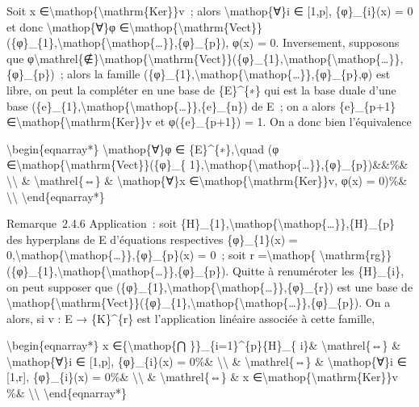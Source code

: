 \documentclass[]{article}
\begin{document}
Soit x ∈\textbackslash{}mathop\{\textbackslash{}mathrm\{Ker\}\}v~; alors
\textbackslash{}mathop\{∀\}i ∈ {[}1,p{]}, \{φ\}\_\{i\}(x) = 0 et donc
\textbackslash{}mathop\{∀\}φ
∈\textbackslash{}mathop\{\textbackslash{}mathrm\{Vect\}\}(\{φ\}\_\{1\},\textbackslash{}mathop\{\textbackslash{}mathop\{\ldots{}\}\},\{φ\}\_\{p\}),
φ(x) = 0. Inversement, supposons que
φ\textbackslash{}mathrel\{∉\}\textbackslash{}mathop\{\textbackslash{}mathrm\{Vect\}\}(\{φ\}\_\{1\},\textbackslash{}mathop\{\textbackslash{}mathop\{\ldots{}\}\},\{φ\}\_\{p\})~;
alors la famille
(\{φ\}\_\{1\},\textbackslash{}mathop\{\textbackslash{}mathop\{\ldots{}\}\},\{φ\}\_\{p\},φ)
est libre, on peut la compléter en une base de \{E\}\^{}\{∗\} qui est la
base duale d'une base
(\{e\}\_\{1\},\textbackslash{}mathop\{\textbackslash{}mathop\{\ldots{}\}\},\{e\}\_\{n\})
de E~; on a alors \{e\}\_\{p+1\}
∈\textbackslash{}mathop\{\textbackslash{}mathrm\{Ker\}\}v et
φ(\{e\}\_\{p+1\}) = 1. On a donc bien l'équivalence

\textbackslash{}begin\{eqnarray*\} \textbackslash{}mathop\{∀\}φ ∈
\{E\}\^{}\{∗\},\textbackslash{}quad (φ
∈\textbackslash{}mathop\{\textbackslash{}mathrm\{Vect\}\}(\{φ\}\_\{
1\},\textbackslash{}mathop\{\textbackslash{}mathop\{\ldots{}\}\},\{φ\}\_\{p\})\&\&\%\&
\textbackslash{}\textbackslash{} \& \textbackslash{}mathrel\{⇔\} \&
\textbackslash{}mathop\{∀\}x
∈\textbackslash{}mathop\{\textbackslash{}mathrm\{Ker\}\}v, φ(x) = 0)\%\&
\textbackslash{}\textbackslash{} \textbackslash{}end\{eqnarray*\}

Remarque~2.4.6 Application~: soit
\{H\}\_\{1\},\textbackslash{}mathop\{\textbackslash{}mathop\{\ldots{}\}\},\{H\}\_\{p\}
des hyperplans de E d'équations respectives \{φ\}\_\{1\}(x) =
0,\textbackslash{}mathop\{\textbackslash{}mathop\{\ldots{}\}\},\{φ\}\_\{p\}(x)
= 0~; soit r =\textbackslash{}mathop\{
\textbackslash{}mathrm\{rg\}\}(\{φ\}\_\{1\},\textbackslash{}mathop\{\textbackslash{}mathop\{\ldots{}\}\},\{φ\}\_\{p\}).
Quitte à renuméroter les \{H\}\_\{i\}, on peut supposer que
(\{φ\}\_\{1\},\textbackslash{}mathop\{\textbackslash{}mathop\{\ldots{}\}\},\{φ\}\_\{r\})
est une base de
\textbackslash{}mathop\{\textbackslash{}mathrm\{Vect\}\}(\{φ\}\_\{1\},\textbackslash{}mathop\{\textbackslash{}mathop\{\ldots{}\}\},\{φ\}\_\{p\}).
On a alors, si v : E → \{K\}\^{}\{r\} est l'application linéaire
associée à cette famille,

\textbackslash{}begin\{eqnarray*\} x ∈\{\textbackslash{}mathop\{⋂
\}\}\_\{i=1\}\^{}\{p\}\{H\}\_\{ i\}\& \textbackslash{}mathrel\{⇔\} \&
\textbackslash{}mathop\{∀\}i ∈ {[}1,p{]}, \{φ\}\_\{i\}(x) = 0\%\&
\textbackslash{}\textbackslash{} \& \textbackslash{}mathrel\{⇔\} \&
\textbackslash{}mathop\{∀\}i ∈ {[}1,r{]}, \{φ\}\_\{i\}(x) = 0\%\&
\textbackslash{}\textbackslash{} \& \textbackslash{}mathrel\{⇔\} \& x
∈\textbackslash{}mathop\{\textbackslash{}mathrm\{Ker\}\}v \%\&
\textbackslash{}\textbackslash{} \textbackslash{}end\{eqnarray*\}
\end{document}

